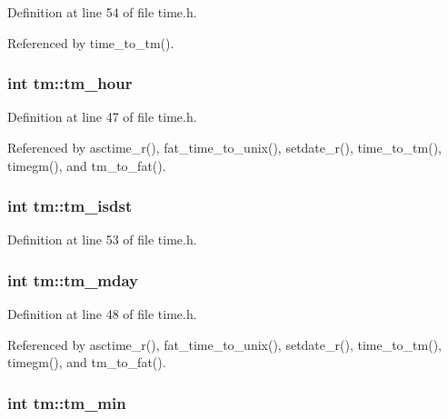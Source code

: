Definition at line 54 of file time.\-h.



Referenced by time\-\_\-to\-\_\-tm().

\hypertarget{structtm_a3e7ca4e37f1abcaf56b8a916c38eb9fe}{
\subsubsection[{tm\-\_\-hour}]{\setlength{\rightskip}{0pt plus 5cm}int tm\-::tm\-\_\-hour}}\label{structtm_a3e7ca4e37f1abcaf56b8a916c38eb9fe}


Definition at line 47 of file time.\-h.



Referenced by asctime\-\_\-r(), fat\-\_\-time\-\_\-to\-\_\-unix(), setdate\-\_\-r(), time\-\_\-to\-\_\-tm(), timegm(), and tm\-\_\-to\-\_\-fat().

\hypertarget{structtm_a5645ca0580c8ab2c24f6c2965d9c9f9c}{
\subsubsection[{tm\-\_\-isdst}]{\setlength{\rightskip}{0pt plus 5cm}int tm\-::tm\-\_\-isdst}}\label{structtm_a5645ca0580c8ab2c24f6c2965d9c9f9c}


Definition at line 53 of file time.\-h.

\hypertarget{structtm_ab8d8904bad43b0c8b96e61941c5b5310}{
\subsubsection[{tm\-\_\-mday}]{\setlength{\rightskip}{0pt plus 5cm}int tm\-::tm\-\_\-mday}}\label{structtm_ab8d8904bad43b0c8b96e61941c5b5310}


Definition at line 48 of file time.\-h.



Referenced by asctime\-\_\-r(), fat\-\_\-time\-\_\-to\-\_\-unix(), setdate\-\_\-r(), time\-\_\-to\-\_\-tm(), timegm(), and tm\-\_\-to\-\_\-fat().

\hypertarget{structtm_af414eb7c86cc3099595211eee4d4211b}{
\subsubsection[{tm\-\_\-min}]{\setlength{\rightskip}{0pt plus 5cm}int tm\-::tm\-\_\-min}}\label{structtm_af414eb7c86cc3099595211eee4d4211b}


